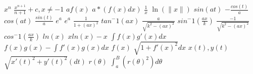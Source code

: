\documentclass{article}
\begin{document}
$x^n$
$\frac{x^{n+1}}{n+1}+c, x\neq-1$
$af(x)$
$a*(f(x)dx)$
$\frac{1}{x}$
$\ln(\|x\|)$
$sin(at)$
$-\frac{cos(t)}{a}$
$cos(at)$
$\frac{sin(t)}{a}$
$e^a$
$e^a$
$\frac{1}{1+(ax)^2}$
$tan^-1(ax)$
$\frac{a}{\sqrt{k^2-(ax)^2}}$
$sin^-1(\frac{ax}{k})$
$\frac{-1}{\sqrt{k^2-(ax)^2}}$
$cos^-1(\frac{ax}{k})$
$ln(x)$
$xln(x)-x$
$\int f(x)g'(x) dx$
$f(x)g(x)-\int f'(x)g(x) dx$
$f(x)$
$\sqrt{1+f'(x)^2} dx$
$x(t), y(t)$
$\sqrt{x'(t)^2 + y'(t)^2}(dt)$
$r(\theta)$
$\int_a^B (r(\theta)^2)d\theta$
\end{document}
